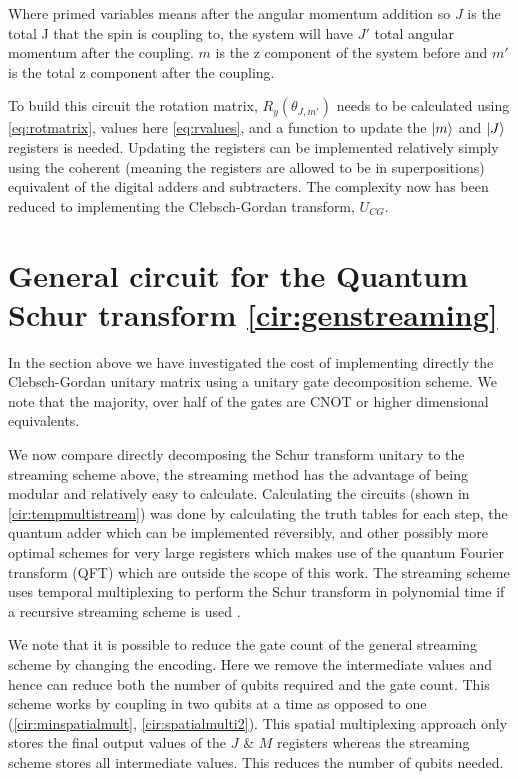\documentclass[12pt]{article}
\begin{document}
Where primed variables means after the angular momentum addition so $J$ is the total J that the spin is coupling to, the system will have $J'$ total angular momentum after the coupling. $m$ is the z component of the system before and $m'$ is the total z component after the coupling.

To build this circuit the rotation matrix, $R_y(\theta_{J,m'})$ needs to be calculated using \autoref{eq:rotmatrix}, values here \autoref{eq:rvalues}, and a function to update the $\left\vert{m}\right\rangle$ and $\left\vert{J}\right\rangle$ registers is needed. Updating the registers can be implemented relatively simply using the coherent (meaning the registers are allowed to be in superpositions) equivalent of the digital adders and subtracters. The complexity now has been reduced to implementing the Clebsch-Gordan transform, $U_{CG}$.

\section{General circuit for the Quantum Schur transform \autoref{cir:genstreaming}}

In the section above we have investigated the cost of implementing directly the Clebsch-Gordan unitary matrix using a unitary gate decomposition scheme. We note that the majority, over half of the gates are CNOT or higher dimensional equivalents.

We now compare directly decomposing the Schur transform unitary to the streaming scheme above, the streaming method has the advantage of being modular and relatively easy to calculate. Calculating the circuits (shown in \autoref{cir:tempmultistream}) was done by calculating the truth tables for each step, the quantum adder which can be implemented reversibly, \cite{draper2004logarithmic} and other possibly more optimal schemes for very large registers which makes use of the quantum Fourier transform (QFT) \cite{draper2000addition} which are outside the scope of this work. The streaming scheme uses temporal multiplexing to perform the Schur transform in polynomial time if a recursive streaming scheme is used \cite{bacon2007quantum}.

We note that it is possible to reduce the gate count of the general streaming scheme by changing the encoding. Here we remove the intermediate values and hence can reduce both the number of qubits required and the gate count. This scheme works by coupling in two qubits at a time as opposed to one (\autoref{cir:minspatialmult}, \autoref{cir:spatialmulti2}). This spatial multiplexing approach only stores the final output values of the $J$ \& $M$ registers whereas the streaming scheme stores all intermediate values. This reduces the number of qubits needed. 
\end{document}
